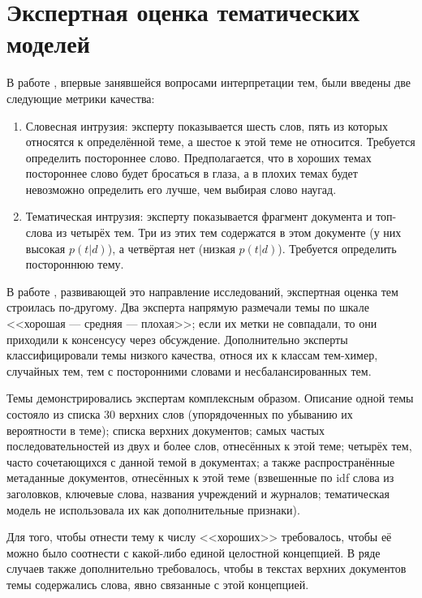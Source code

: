 \section{Экспертная оценка тематических моделей}

В работе \cite{rtl}, впервые занявшейся вопросами интерпретации тем, были введены две следующие метрики качества:

\begin{enumerate}
\item{Словесная интрузия: эксперту показывается шесть слов, пять из которых относятся к определённой теме, а шестое к этой теме не относится. Требуется определить постороннее слово. Предполагается, что в хороших темах постороннее слово будет бросаться в глаза, а в плохих темах будет невозможно определить его лучше, чем выбирая слово наугад.}
\item{Тематическая интрузия: эксперту показывается фрагмент документа и топ-слова из четырёх тем. Три из этих тем содержатся в этом документе (у них высокая $p(t|d)$), а четвёртая нет (низкая $p(t|d)$). Требуется определить постороннюю тему.}
\end{enumerate}

В работе \cite{mimno}, развивающей это направление исследований, экспертная оценка тем строилась по-другому. Два эксперта напрямую размечали темы по шкале <<хорошая --- средняя --- плохая>>; если их метки не совпадали, то они приходили к консенсусу через обсуждение. Дополнительно эксперты классифицировали темы низкого качества, относя их к классам тем-химер, случайных тем, тем с посторонними словами и несбалансированных тем.

Темы демонстрировались экспертам комплексным образом. Описание одной темы состояло из списка 30 верхних слов (упорядоченных по убыванию их вероятности в теме); списка верхних документов; самых частых последовательностей из двух и более слов, отнесённых к этой теме; четырёх тем, часто сочетающихся с данной темой в документах; а также распространённые метаданные документов, отнесённых к этой теме (взвешенные по idf слова из заголовков, ключевые слова, названия учреждений и журналов; тематическая модель не использовала их как дополнительные признаки).

Для того, чтобы отнести тему к числу <<хороших>> требовалось, чтобы её можно было соотнести с какой-либо единой целостной концепцией. В ряде случаев также дополнительно требовалось, чтобы в текстах верхних документов темы содержались слова, явно связанные с этой концепцией.

